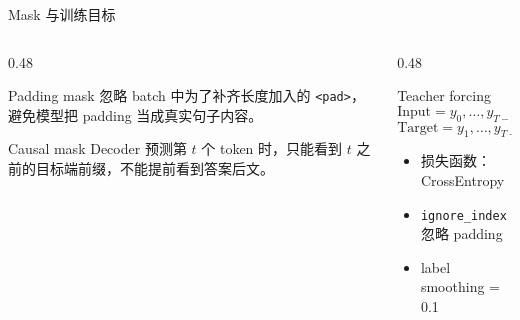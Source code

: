 \documentclass[aspectratio=169,10pt]{ctexbeamer}
\begin{document}
\begin{frame}{Mask 与训练目标}
	\begin{columns}[T,onlytextwidth]
		\begin{column}{0.48\textwidth}
			\begin{block}{Padding mask}
				忽略 batch 中为了补齐长度加入的 \texttt{<pad>}，避免模型把 padding 当成真实句子内容。
			\end{block}
			\begin{block}{Causal mask}
				Decoder 预测第 $t$ 个 token 时，只能看到 $t$ 之前的目标端前缀，不能提前看到答案后文。
			\end{block}
		\end{column}
		\begin{column}{0.48\textwidth}
			\begin{block}{Teacher forcing}
				\[
					\mathrm{Input}=y_0,\ldots,y_{T-2}
				\]
				\[
					\mathrm{Target}=y_1,\ldots,y_{T-1}
				\]
			\end{block}
			\begin{itemize}
				\item 损失函数：CrossEntropy
				\item \texttt{ignore\_index} 忽略 padding
				\item label smoothing = 0.1
			\end{itemize}
		\end{column}
	\end{columns}
\end{frame}
\end{document}
